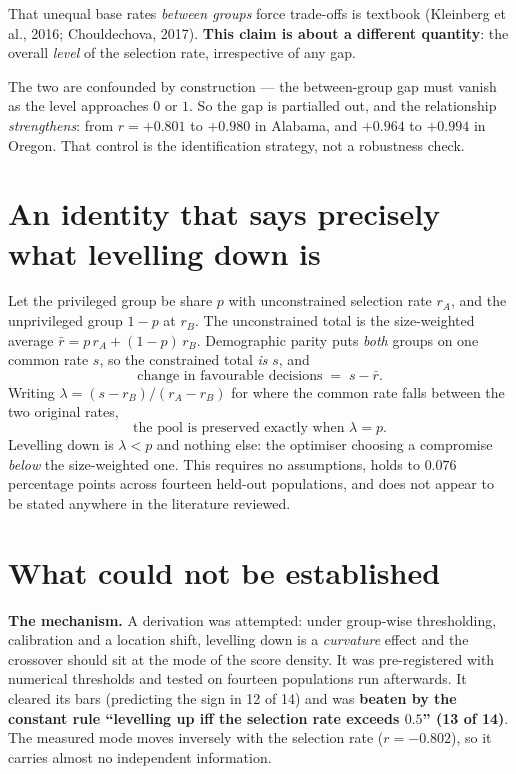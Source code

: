 \documentclass[11pt,a4paper]{article}
\newcommand{\claim}[1]{\medskip\noindent\textbf{#1}\quad}
\begin{document}
That unequal base rates \emph{between groups} force trade-offs is textbook (Kleinberg et
al., 2016; Chouldechova, 2017). \textbf{This claim is about a different quantity}: the
overall \emph{level} of the selection rate, irrespective of any gap.

The two are confounded by construction --- the between-group gap must vanish as the level
approaches $0$ or $1$. So the gap is partialled out, and the relationship
\emph{strengthens}: from $r = +0.801$ to $+0.980$ in Alabama, and $+0.964$ to $+0.994$ in
Oregon. That control is the identification strategy, not a robustness check.

\section{An identity that says precisely what levelling down is}

Let the privileged group be share $p$ with unconstrained selection rate $r_A$, and the
unprivileged group $1-p$ at $r_B$. The unconstrained total is the size-weighted average
$\bar{r} = p\,r_A + (1-p)\,r_B$. Demographic parity puts \emph{both} groups on one common
rate $s$, so the constrained total \emph{is} $s$, and
\[
\text{change in favourable decisions} \;=\; s - \bar{r}.
\]
Writing $\lambda = (s - r_B)/(r_A - r_B)$ for where the common rate falls between the two
original rates,
\[
\boxed{\;\text{the pool is preserved exactly when } \lambda = p.\;}
\]
Levelling down is $\lambda < p$ and nothing else: the optimiser choosing a compromise
\emph{below} the size-weighted one. This requires no assumptions, holds to $0.076$
percentage points across fourteen held-out populations, and does not appear to be stated
anywhere in the literature reviewed.

\section{What could not be established}

\claim{The mechanism.} A derivation was attempted: under group-wise thresholding,
calibration and a location shift, levelling down is a \emph{curvature} effect and the
crossover should sit at the mode of the score density. It was pre-registered with numerical
thresholds and tested on fourteen populations run afterwards. It cleared its bars
(predicting the sign in 12 of 14) and was \textbf{beaten by the constant rule ``levelling up
iff the selection rate exceeds $0.5$'' (13 of 14)}. The measured mode moves inversely with
the selection rate ($r = -0.802$), so it carries almost no independent information.
\end{document}
